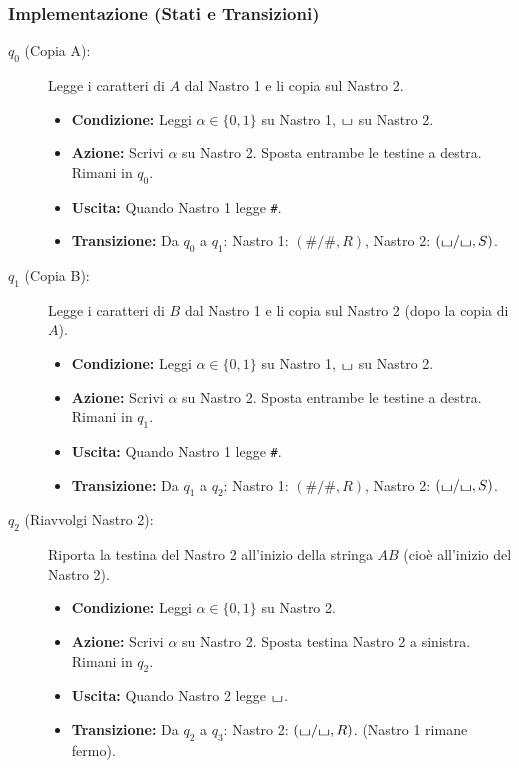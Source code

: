 \documentclass[a4paper]{article}
\theoremstyle{definition} %
\newcommand{\blankS}{\ensuremath{\raisebox{-0.15ex}{\scalebox{1.3}[0.7]{$\sqcup$}}}}
\begin{document}
\subsubsection{Implementazione (Stati e Transizioni)}
\begin{description}
    \item[$q_0$ (Copia A):] Legge i caratteri di $A$ dal Nastro 1 e li copia sul Nastro 2.
    \begin{itemize}
        \item \textbf{Condizione:} Leggi $\alpha \in \{0,1\}$ su Nastro 1, $\blankS$ su Nastro 2.
        \item \textbf{Azione:} Scrivi $\alpha$ su Nastro 2. Sposta entrambe le testine a destra. Rimani in $q_0$.
        \item \textbf{Uscita:} Quando Nastro 1 legge \texttt{\#}.
        \item \textbf{Transizione:} Da $q_0$ a $q_1$: Nastro 1: $(\texttt{\#}/\texttt{\#}, R)$, Nastro 2: $(\blankS/\blankS, S)$.
    \end{itemize}
    \item[$q_1$ (Copia B):] Legge i caratteri di $B$ dal Nastro 1 e li copia sul Nastro 2 (dopo la copia di $A$).
    \begin{itemize}
        \item \textbf{Condizione:} Leggi $\alpha \in \{0,1\}$ su Nastro 1, $\blankS$ su Nastro 2.
        \item \textbf{Azione:} Scrivi $\alpha$ su Nastro 2. Sposta entrambe le testine a destra. Rimani in $q_1$.
        \item \textbf{Uscita:} Quando Nastro 1 legge \texttt{\#}.
        \item \textbf{Transizione:} Da $q_1$ a $q_2$: Nastro 1: $(\texttt{\#}/\texttt{\#}, R)$, Nastro 2: $(\blankS/\blankS, S)$.
    \end{itemize}
    \item[$q_2$ (Riavvolgi Nastro 2):] Riporta la testina del Nastro 2 all'inizio della stringa $AB$ (cioè all'inizio del Nastro 2).
    \begin{itemize}
        \item \textbf{Condizione:} Leggi $\alpha \in \{0,1\}$ su Nastro 2.
        \item \textbf{Azione:} Scrivi $\alpha$ su Nastro 2. Sposta testina Nastro 2 a sinistra. Rimani in $q_2$.
        \item \textbf{Uscita:} Quando Nastro 2 legge $\blankS$.
        \item \textbf{Transizione:} Da $q_2$ a $q_3$: Nastro 2: $(\blankS/\blankS, R)$. (Nastro 1 rimane fermo).

\end{itemize}
\end{description}
\end{document}
